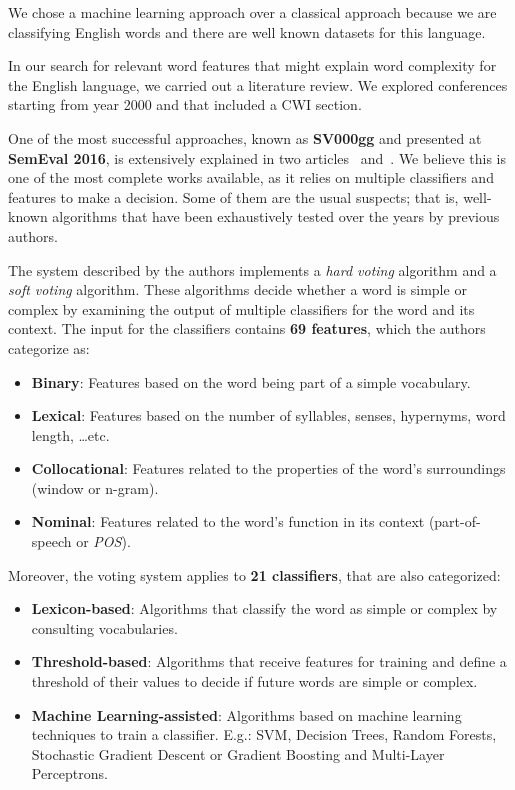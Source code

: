 \documentclass[11pt,a4paper]{article}
\begin{document}
We chose a machine learning approach over a classical approach because we are classifying English words and there are well known datasets for this language.

In our search for relevant word features that might explain word complexity for the English language, we carried out a literature review. We explored conferences starting from year 2000 and that included a CWI section.

One of the most successful approaches, known as \textbf{SV000gg} and presented at \textbf{SemEval 2016}, is extensively explained in two articles~\cite{paetzold2016semeval} and~\cite{paetzold2016sv000gg}. We believe this is one of the most complete works available, as it relies on multiple classifiers and features to make a decision. Some of them are the usual suspects; that is, well-known algorithms that have been exhaustively tested over the years by previous authors.

The system described by the authors implements a \emph{hard voting} algorithm and a \emph{soft voting} algorithm. These algorithms decide whether a word is simple or complex by examining the output of multiple classifiers for the word and its context. The input for the classifiers contains \textbf{69 features}, which the authors categorize as:

\begin{itemize}
	\item{\textbf{Binary}: Features based on the word being part of a simple vocabulary.}
	\item{\textbf{Lexical}: Features based on the number of syllables, senses, hypernyms, word length, \dots etc.}
	\item{\textbf{Collocational}: Features related to the properties of the word's surroundings (window or n-gram).}
	\item{\textbf{Nominal}: Features related to the word's function in its context (part-of-speech or \emph{POS}).}
\end{itemize}

Moreover, the voting system applies to \textbf{21 classifiers}, that are also categorized:

\begin{itemize}
	\item{\textbf{Lexicon-based}: Algorithms that classify the word as simple or complex by consulting vocabularies.}
	\item{\textbf{Threshold-based}: Algorithms that receive features for training and define a threshold of their values to decide if future words are simple or complex.}
	\item{\textbf{Machine Learning-assisted}: Algorithms based on machine learning techniques to train a classifier. E.g.: SVM, Decision Trees, Random Forests, Stochastic Gradient Descent or Gradient Boosting and Multi-Layer Perceptrons.}
\end{itemize}
\end{document}
